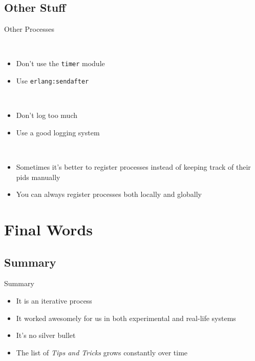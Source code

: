 \documentclass[utf8]{beamer}
\begin{document}
\subsection{Other Stuff}
\begin{frame}{Other Processes}
	\begin{description}
		\item<+->[Timers]\ \\
			\begin{itemize}
				\item Don't use the \texttt{timer} module
				\item Use \texttt{erlang:send\textunderscore after}
			\end{itemize}
		\item<+->[Logging]\ \\
			\begin{itemize}
				\item Don't log too much
				\item Use a good logging system
			\end{itemize}
		\item<+->[Registration]\ \\
			\begin{itemize}
				\item Sometimes it's better to register processes instead of keeping track of their pids manually
				\item You can always register processes \alert{both} locally and globally
			\end{itemize}
	\end{description}
\end{frame}

\section{Final Words}
\subsection{Summary}
\begin{frame}{Summary}
	\begin{itemize}
		\item<+-> It is an \alert{iterative} process
		\item<+-> It worked awesomely for us in both experimental and real-life systems
		\item<+-> It's no \alert{silver bullet}
		\item<+-> The list of \emph{Tips and Tricks} grows \alert{constantly} over time
	\end{itemize}
\end{frame}
\end{document}
